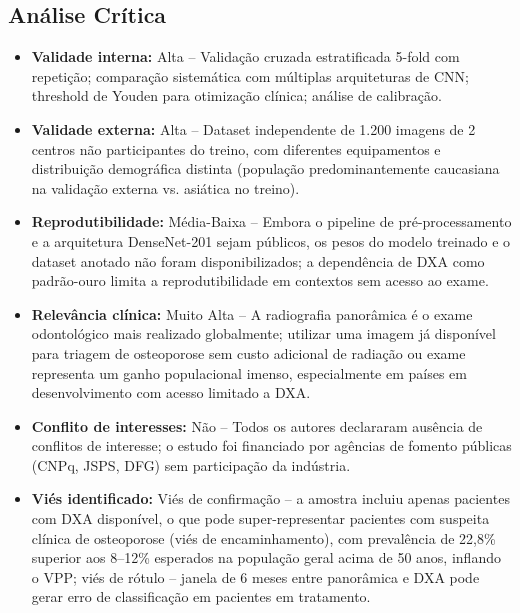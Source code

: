 \subsection{Análise Crítica}
\begin{itemize}
  \item \textbf{Validade interna:} Alta -- Validação cruzada estratificada
        5-fold com repetição; comparação sistemática com múltiplas
        arquiteturas de CNN; threshold de Youden para otimização
        clínica; análise de calibração.
  \item \textbf{Validade externa:} Alta -- Dataset independente de 1.200
        imagens de 2 centros não participantes do treino, com
        diferentes equipamentos e distribuição demográfica distinta
        (população predominantemente caucasiana na validação externa
        vs. asiática no treino).
  \item \textbf{Reprodutibilidade:} Média-Baixa -- Embora o pipeline de
        pré-processamento e a arquitetura DenseNet-201 sejam públicos,
        os pesos do modelo treinado e o dataset anotado não foram
        disponibilizados; a dependência de DXA como padrão-ouro
        limita a reprodutibilidade em contextos sem acesso ao exame.
  \item \textbf{Relevância clínica:} Muito Alta -- A radiografia
        panorâmica é o exame odontológico mais realizado globalmente;
        utilizar uma imagem já disponível para triagem de osteoporose
        sem custo adicional de radiação ou exame representa um ganho
        populacional imenso, especialmente em países em
        desenvolvimento com acesso limitado a DXA.
  \item \textbf{Conflito de interesses:} Não -- Todos os autores
        declararam ausência de conflitos de interesse; o estudo foi
        financiado por agências de fomento públicas (CNPq, JSPS,
        DFG) sem participação da indústria.
  \item \textbf{Viés identificado:} Viés de confirmação -- a amostra
        incluiu apenas pacientes com DXA disponível, o que pode
        super-representar pacientes com suspeita clínica de
        osteoporose (viés de encaminhamento), com prevalência de
        22,8\% superior aos 8--12\% esperados na população geral
        acima de 50 anos, inflando o VPP; viés de rótulo -- janela
        de 6 meses entre panorâmica e DXA pode gerar erro de
        classificação em pacientes em tratamento.
\end{itemize}

